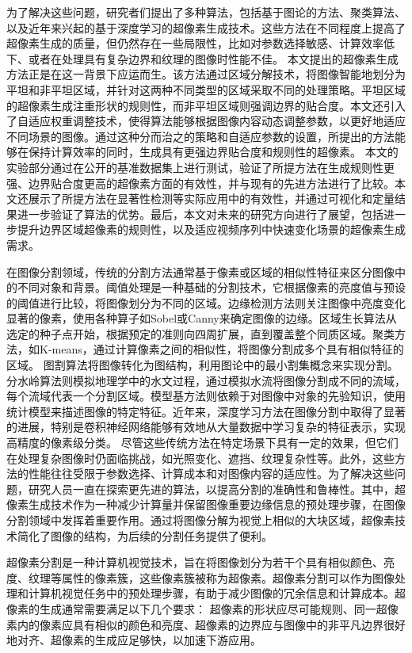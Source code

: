为了解决这些问题，研究者们提出了多种算法，包括基于图论的方法、聚类算法、以及近年来兴起的基于深度学习的超像素生成技术。这些方法在不同程度上提高了超像素生成的质量，但仍然存在一些局限性，比如对参数选择敏感、计算效率低下、或者在处理具有复杂边界和纹理的图像时性能不佳。
本文提出的超像素生成方法正是在这一背景下应运而生。该方法通过区域分解技术，将图像智能地划分为平坦和非平坦区域，并针对这两种不同类型的区域采取不同的处理策略。平坦区域的超像素生成注重形状的规则性，而非平坦区域则强调边界的贴合度。本文还引入了自适应权重调整技术，使得算法能够根据图像内容动态调整参数，以更好地适应不同场景的图像。通过这种分而治之的策略和自适应参数的设置，所提出的方法能够在保持计算效率的同时，生成具有更强边界贴合度和规则性的超像素。
本文的实验部分通过在公开的基准数据集上进行测试，验证了所提方法在生成规则性更强、边界贴合度更高的超像素方面的有效性，并与现有的先进方法进行了比较。本文还展示了所提方法在显著性检测等实际应用中的有效性，并通过可视化和定量结果进一步验证了算法的优势。最后，本文对未来的研究方向进行了展望，包括进一步提升边界区域超像素的规则性，以及适应视频序列中快速变化场景的超像素生成需求。

在图像分割领域，传统的分割方法通常基于像素或区域的相似性特征来区分图像中的不同对象和背景。阈值处理是一种基础的分割技术，它根据像素的亮度值与预设的阈值进行比较，将图像划分为不同的区域。边缘检测方法则关注图像中亮度变化显著的像素，使用各种算子如Sobel或Canny来确定图像的边缘。区域生长算法从选定的种子点开始，根据预定的准则向四周扩展，直到覆盖整个同质区域。聚类方法，如K-means，通过计算像素之间的相似性，将图像分割成多个具有相似特征的区域。
图割算法将图像转化为图结构，利用图论中的最小割集概念来实现分割。分水岭算法则模拟地理学中的水文过程，通过模拟水流将图像分割成不同的流域，每个流域代表一个分割区域。模型基方法则依赖于对图像中对象的先验知识，使用统计模型来描述图像的特定特征。近年来，深度学习方法在图像分割中取得了显著的进展，特别是卷积神经网络能够有效地从大量数据中学习复杂的特征表示，实现高精度的像素级分类。
尽管这些传统方法在特定场景下具有一定的效果，但它们在处理复杂图像时仍面临挑战，如光照变化、遮挡、纹理复杂性等。此外，这些方法的性能往往受限于参数选择、计算成本和对图像内容的适应性。为了解决这些问题，研究人员一直在探索更先进的算法，以提高分割的准确性和鲁棒性。其中，超像素生成技术作为一种减少计算量并保留图像重要边缘信息的预处理步骤，在图像分割领域中发挥着重要作用。通过将图像分解为视觉上相似的大块区域，超像素技术简化了图像的结构，为后续的分割任务提供了便利。\cite{JSJA2023S1052}

超像素分割是一种计算机视觉技术，旨在将图像划分为若干个具有相似颜色、亮度、纹理等属性的像素簇，这些像素簇被称为超像素。超像素分割可以作为图像处理和计算机视觉任务中的预处理步骤，有助于减少图像的冗余信息和计算成本。超像素的生成通常需要满足以下几个要求：
超像素的形状应尽可能规则、同一超像素内的像素应具有相似的颜色和亮度、超像素的边界应与图像中的非平凡边界很好地对齐、超像素的生成应足够快，以加速下游应用。

